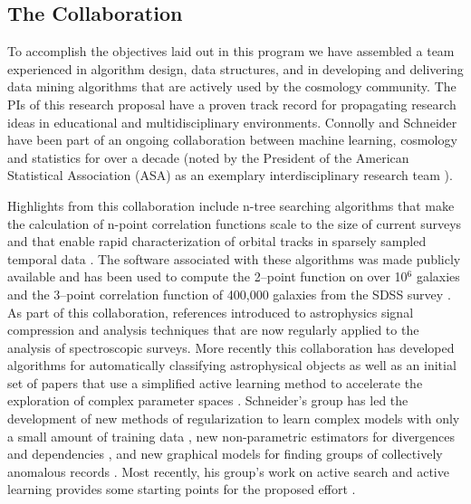 \documentclass[prd,nofootbib,floatfix,11pt,tightenlines,nofootinbib]{revtex4}
\begin{document}
\subsection{The Collaboration}

To accomplish the objectives laid out in this program we have
assembled a team experienced in algorithm design, data structures, and
in developing and delivering data mining algorithms that are actively
used by the cosmology community. The PIs of this research proposal
have a proven track record for propagating research ideas in
educational and multidisciplinary environments. Connolly and Schneider
have been part of an ongoing collaboration between machine learning,
cosmology and statistics for over a decade (noted by the President
of the American Statistical Association (ASA) as an exemplary
interdisciplinary research team \cite{straf03}).

Highlights from this collaboration include n-tree searching algorithms that
make the calculation of n-point correlation functions scale to the size of
current surveys \cite{GrayMoore} and that enable rapid characterization of
orbital tracks in sparsely sampled temporal data \cite{kubica}. The
software associated with these algorithms was made publicly available and
has been used to compute the 2--point function on over 10$^6$ galaxies and
the 3--point correlation function of 400,000 galaxies from the SDSS survey
\cite{Scranton2002,Szapudi2002,Nichol2006,mcbride2011a,mcbride2011b}.
As part of this collaboration,
references \cite{yip2004a, vdp2009, daniel2011}
introduced to astrophysics signal compression and analysis techniques that
are now regularly applied to the analysis of spectroscopic surveys. More
recently this collaboration has developed algorithms for automatically
classifying astrophysical objects \cite{vdp2009,daniel2011} as well as an
initial set of papers that use a simplified active learning method to
accelerate the exploration of complex parameter spaces \cite{daniel2012}.
Schneider's group has led the development of new methods of regularization
to learn complex models with only a small amount of training data
\cite{YiZhangICML2010,YiZhangSDM2010,YiZhangMultitask2010,YiZhang2011multiECOC,YiZhang2012},
new non-parametric estimators for divergences and dependencies
\cite{poczos11alphadiv,Poczos2011UAI,poczos12CVPR}, and new graphical
models for finding groups of collectively anomalous records
\cite{Xiong2011gad,xiong2011fgm}.  Most recently, his group's work on
active search and active learning provides some starting points for the
proposed effort \cite{Tesch13,Wang13,Sutherland13,Garnett12}.
 
\end{document}
